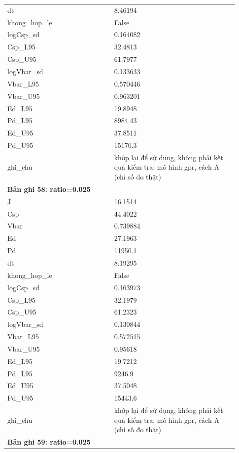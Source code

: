 \begin{longtable}{p{0.43\linewidth}p{0.50\linewidth}}
dt & 8.46194 \\
khong\_\allowbreak hop\_\allowbreak le & False \\
logCsp\_\allowbreak sd & 0.164082 \\
Csp\_\allowbreak L95 & 32.4813 \\
Csp\_\allowbreak U95 & 61.7977 \\
logVbar\_\allowbreak sd & 0.133633 \\
Vbar\_\allowbreak L95 & 0.570446 \\
Vbar\_\allowbreak U95 & 0.963201 \\
Ed\_\allowbreak L95 & 19.8948 \\
Pd\_\allowbreak L95 & 8984.43 \\
Ed\_\allowbreak U95 & 37.8511 \\
Pd\_\allowbreak U95 & 15170.3 \\
ghi\_\allowbreak chu & khớp lại để sử dụng, không phải kết quả kiểm tra; mô hình gpr, cách A (chỉ số đo thật) \\
\midrule
\multicolumn{2}{p{0.95\linewidth}}{\textbf{Bản ghi 58: ratio=0.025}} \\
J & 16.1514 \\
Csp & 44.4022 \\
Vbar & 0.739884 \\
Ed & 27.1963 \\
Pd & 11950.1 \\
dt & 8.19295 \\
khong\_\allowbreak hop\_\allowbreak le & False \\
logCsp\_\allowbreak sd & 0.163973 \\
Csp\_\allowbreak L95 & 32.1979 \\
Csp\_\allowbreak U95 & 61.2323 \\
logVbar\_\allowbreak sd & 0.130844 \\
Vbar\_\allowbreak L95 & 0.572515 \\
Vbar\_\allowbreak U95 & 0.95618 \\
Ed\_\allowbreak L95 & 19.7212 \\
Pd\_\allowbreak L95 & 9246.9 \\
Ed\_\allowbreak U95 & 37.5048 \\
Pd\_\allowbreak U95 & 15443.6 \\
ghi\_\allowbreak chu & khớp lại để sử dụng, không phải kết quả kiểm tra; mô hình gpr, cách A (chỉ số đo thật) \\
\midrule
\multicolumn{2}{p{0.95\linewidth}}{\textbf{Bản ghi 59: ratio=0.025}} \\

\end{longtable}
